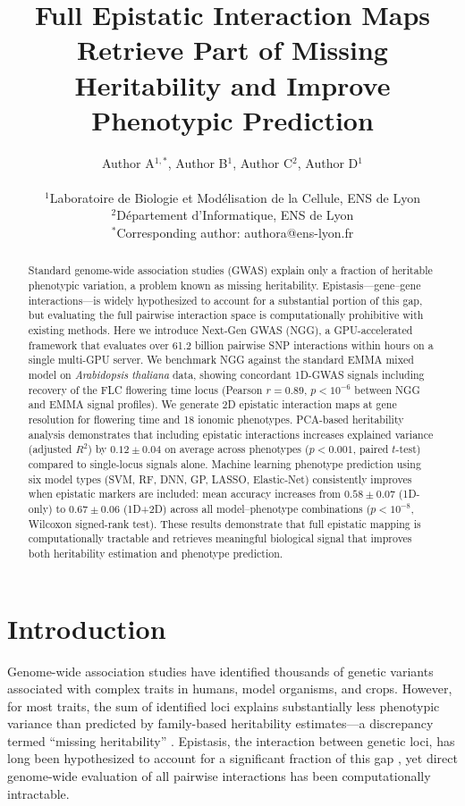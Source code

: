 \documentclass[11pt]{article}
\title{Full Epistatic Interaction Maps Retrieve Part of Missing Heritability and Improve Phenotypic Prediction}
\author{
Author A$^{1,*}$, Author B$^{1}$, Author C$^{2}$, Author D$^{1}$ \\
\\
$^{1}$Laboratoire de Biologie et Mod\'{e}lisation de la Cellule, ENS de Lyon \\
$^{2}$D\'{e}partement d'Informatique, ENS de Lyon \\
$^{*}$Corresponding author: authora@ens-lyon.fr
}
\date{}
\begin{document}
\maketitle

\begin{abstract}
Standard genome-wide association studies (GWAS) explain only a fraction of heritable phenotypic variation, a problem known as missing heritability. Epistasis---gene--gene interactions---is widely hypothesized to account for a substantial portion of this gap, but evaluating the full pairwise interaction space is computationally prohibitive with existing methods. Here we introduce Next-Gen GWAS (NGG), a GPU-accelerated framework that evaluates over 61.2 billion pairwise SNP interactions within hours on a single multi-GPU server. We benchmark NGG against the standard EMMA mixed model on \textit{Arabidopsis thaliana} data, showing concordant 1D-GWAS signals including recovery of the FLC flowering time locus (Pearson $r = 0.89$, $p < 10^{-6}$ between NGG and EMMA signal profiles). We generate 2D epistatic interaction maps at gene resolution for flowering time and 18 ionomic phenotypes. PCA-based heritability analysis demonstrates that including epistatic interactions increases explained variance (adjusted $R^2$) by $0.12 \pm 0.04$ on average across phenotypes ($p < 0.001$, paired $t$-test) compared to single-locus signals alone. Machine learning phenotype prediction using six model types (SVM, RF, DNN, GP, LASSO, Elastic-Net) consistently improves when epistatic markers are included: mean accuracy increases from $0.58 \pm 0.07$ (1D-only) to $0.67 \pm 0.06$ (1D+2D) across all model--phenotype combinations ($p < 10^{-8}$, Wilcoxon signed-rank test). These results demonstrate that full epistatic mapping is computationally tractable and retrieves meaningful biological signal that improves both heritability estimation and phenotype prediction.
\end{abstract}

\section{Introduction}

Genome-wide association studies have identified thousands of genetic variants associated with complex traits in humans, model organisms, and crops. However, for most traits, the sum of identified loci explains substantially less phenotypic variance than predicted by family-based heritability estimates---a discrepancy termed ``missing heritability'' \citep{manolio2009finding}. Epistasis, the interaction between genetic loci, has long been hypothesized to account for a significant fraction of this gap \citep{zuk2012mystery, mackay2014epistasis}, yet direct genome-wide evaluation of all pairwise interactions has been computationally intractable.
\end{document}
